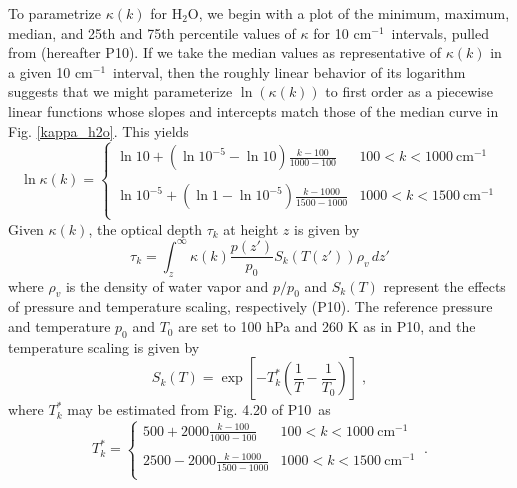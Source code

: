 \documentclass[10pt]{article}
\newcommand{\beqn}{\begin{equation}}
\newcommand{\eeqn}{\end{equation}}
\newcommand{\n}{\nonumber}
\newcommand{\htwo}{\ensuremath{\mathrm{H_2O}}}
\newcommand{\cminverse}{\ensuremath{\mathrm{cm^{-1}}}}
\newcommand{\pierre}{P10}
\begin{document}
To parametrize $\kappa(k)$ for \htwo, we begin with a plot of the minimum, maximum, median, and 25th and 75th percentile values of $\kappa$ for 10 \cminverse\ intervals, pulled from \cite{pierrehumbert2010} (hereafter \pierre). If we take the median values as representative of $\kappa(k)$ in a given 10 \cminverse\ interval, then the roughly
linear behavior of its logarithm suggests that we might parameterize $\ln(\kappa(k))$  to first order as a piecewise linear functions whose slopes and intercepts match those of the median curve in Fig. \ref{kappa_h2o}. This yields
\beqn
	\ln \kappa(k) = \left\{ \begin{array}{lc}
						\ln 10 + (\ln 10^{-5} -\ln 10)\frac{k-100}{1000-100} & 100 < k < 1000 \ \cminverse \\
							& \\
						\ln 10^{-5} + (\ln 1 -\ln 10^{-5})\frac{k-1000}{1500-1000} & 1000 < k < 1500 \ \cminverse \\
					\end{array} \right.								
\label{kappa_param}
\eeqn
Given $\kappa(k)$, the optical depth $\tau_k$ at height $z$ is given by 
	\beqn
		\tau_k = \int_z^\infty \kappa(k) \frac{p(z')}{p_0}S_k(T(z')) \rho_v\, dz'  
		\label{tau1}
	\eeqn
where $\rho_v$ is the density of water vapor and $p/p_0$ and $S_k(T)$ represent the effects of pressure and temperature scaling, respectively (\pierre). The reference pressure and temperature $p_0$ and $T_0$ are set to 100 hPa and 260 K as in \pierre, and the temperature scaling  is given by 
	\beqn
		S_k(T) =  \exp\left[-T_k^*\left(\frac{1}{T}-\frac{1}{T_0}\right)\right]\; ,  \n
	\eeqn
	where $T_k^*$ may be estimated from Fig. 4.20 of \pierre\ as 
	\beqn
		T_k^* = \left\{ \begin{array}{lc}
							500 + 2000\frac{k-100}{1000-100} & 100 < k < 1000 \ \cminverse \\
								& \\
							2500 -2000\frac{k-1000}{1500-1000} & 1000 < k < 1500 \ \cminverse \\
						\end{array} \right.	\ .							
		\label{Tstar_param}
		\n
	\eeqn
		
\end{document}
